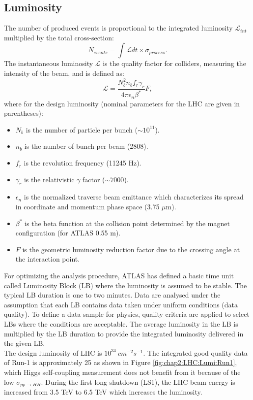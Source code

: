 \subsection{Luminosity}
\label{chap2:LHC:Lumi}
The number of produced events is proportional to the integrated luminosity $\mathcal{L}_{int}$ multiplied by the total cross-section: 
\begin{equation}
N_{events} = \int\mathcal{L} dt \times \sigma_{process}.
\end{equation}
The instantaneous luminosity $\mathcal{L}$ is the quality factor for colliders, measuring the intensity of the beam, and is defined as:
\begin{equation}
\mathcal{L} = \frac{N_b^2n_bf_r\gamma_r}{4\pi\epsilon_n\beta^*}F,
\end{equation}
where for the design luminosity (nominal parameters for the LHC are given in parentheses):
\begin{itemize}
	\item $N_b$ is the number of particle per bunch ($\sim10^{11}$).
	\item $n_b$ is the number of bunch per beam (2808).
	\item $f_r$ is the revolution frequency (11245 Hz).
	\item $\gamma_r$ is the relativistic $\gamma$ factor ($\sim 7000$).
	\item $\epsilon_n$ is the normalized traverse beam emittance which characterizes its spread in coordinate and momentum phase space (3.75 $\mu$m).
	\item $\beta^*$ is the beta function at the collision point determined by the magnet configuration (for ATLAS 0.55 m).
	\item $F$ is the geometric luminosity reduction factor due to the crossing angle at the interaction point.
\end{itemize}
For optimizing the analysis procedure, ATLAS has defined a basic time unit called Luminosity Block (LB) where the luminosity is assumed to be stable. The typical LB duration is one to two minutes. Data are analysed under the assumption that each LB contains data taken under uniform conditions (data quality). To define a data sample for physics, quality criteria are applied to select LBs where the conditions are acceptable. The average luminosity in the LB is multiplied by the LB duration to provide the integrated luminosity delivered in the given LB. \\
The design luminosity of LHC is $10^{34} \ cm^{-2}s^{-1}$. The integrated good quality data of Run-1 is approximately 25 \ifb as shown in Figure \ref{fig:chap2:LHC:Lumi:Run1}, which Higgs self-coupling measurement does not benefit from it because of the low $\sigma_{pp\rightarrow HH}$. During the first long shutdown (LS1), the LHC beam energy is increased from 3.5 TeV to 6.5 TeV which increases the luminosity. 
